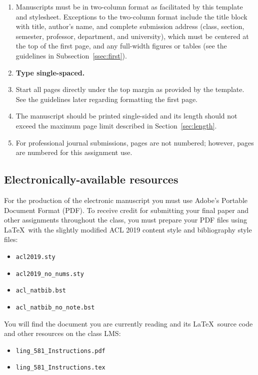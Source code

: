 \documentclass[11pt,table,xcdraw]{article}
\begin{document}
\begin{enumerate}
    \item Manuscripts must be in two-column format as facilitated by this template and stylesheet.  Exceptions to the two-column format include the title block with title, author's name, and complete submission address (class, section, semester, professor, department, and university), which must be centered at the top of the first page, and any full-width figures or tables (see the guidelines in Subsection~\ref{ssec:first}). 
    \item {\bf Type single-spaced.}  
    \item Start all pages directly under the top margin as provided by the template. See the guidelines later regarding formatting the first page.  
    \item The manuscript should be printed single-sided and its length should not exceed the maximum page limit described in Section~\ref{sec:length}. 
    \item For professional journal submissions, pages are not numbered; however, pages are numbered for this assignment use.
\end{enumerate}


\subsection{Electronically-available resources}

For the production of the electronic manuscript you must use Adobe's Portable Document Format (PDF). To receive credit for submitting your final paper and other assignments throughout the class, you must prepare your PDF files using \LaTeX\ with the slightly modified ACL 2019 content style and bibliography style files:

\begin{itemize}
    \item \texttt{acl2019.sty}
    \item \texttt{acl2019\_no\_nums.sty}
    \item \texttt{acl\_natbib.bst} 
    \item \texttt{acl\_natbib\_no\_note.bst}
\end{itemize}


You will find the document you are currently reading and its \LaTeX\ source code and other resources on the class LMS:

\begin{itemize}
    \item \texttt{ling\_581\_Instructions.pdf}
    \item \texttt{ling\_581\_Instructions.tex}
\end{itemize}
\end{document}
